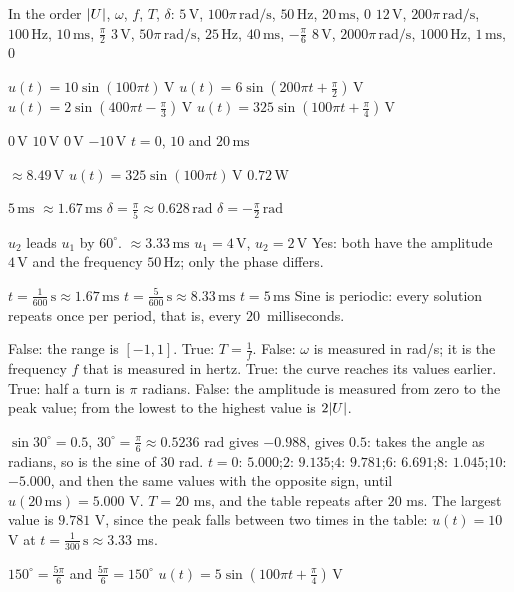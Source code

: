 \begin{facit}
 In the order $\lvert U\rvert$, $\omega$, $f$, $T$, $\delta$:
 $5\,\text{V}$, $100\pi\,\text{rad/s}$, $50\,\text{Hz}$, $20\,\text{ms}$, $0$
 $12\,\text{V}$, $200\pi\,\text{rad/s}$, $100\,\text{Hz}$, $10\,\text{ms}$, $\frac{\pi}{2}$
 $3\,\text{V}$, $50\pi\,\text{rad/s}$, $25\,\text{Hz}$, $40\,\text{ms}$, $-\frac{\pi}{6}$
 $8\,\text{V}$, $2000\pi\,\text{rad/s}$, $1000\,\text{Hz}$, $1\,\text{ms}$, $0$

  $u(t) = 10\sin(100\pi t)\,\text{V}$
 $u(t) = 6\sin(200\pi t + \frac{\pi}{2})\,\text{V}$
 $u(t) = 2\sin(400\pi t - \frac{\pi}{3})\,\text{V}$
 $u(t) = 325\sin(100\pi t + \frac{\pi}{4})\,\text{V}$

  $0\,\text{V}$  $10\,\text{V}$  $0\,\text{V}$  $-10\,\text{V}$
 $t = 0$, $10$ and $20\,\text{ms}$

  $\approx 8.49\,\text{V}$  $u(t) = 325\sin(100\pi t)\,\text{V}$
 $0.72\,\text{W}$

  $5\,\text{ms}$  $\approx 1.67\,\text{ms}$
 $\delta = \frac{\pi}{5} \approx 0.628\,\text{rad}$
 $\delta = -\frac{\pi}{2}\,\text{rad}$

  $u_2$ leads $u_1$ by $60^{\circ}$.  $\approx 3.33\,\text{ms}$
 $u_1 = 4\,\text{V}$, $u_2 = 2\,\text{V}$
 Yes: both have the amplitude $4\,\text{V}$ and the frequency $50\,\text{Hz}$; only the phase
differs.

  $t = \frac{1}{600}\,\text{s} \approx 1.67\,\text{ms}$
 $t = \frac{5}{600}\,\text{s} \approx 8.33\,\text{ms}$  $t = 5\,\text{ms}$
 Sine is periodic: every solution repeats once per period, that is, every
$20$~milliseconds.

  False: the range is $[-1, 1]$.
 True: $T = \frac{1}{f}$.
 False: $\omega$ is measured in rad/s; it is the frequency $f$ that is measured in hertz.
 True: the curve reaches its values earlier.
 True: half a turn is $\pi$ radians.
 False: the amplitude is measured from zero to the peak value; from the lowest to the
highest value is $2\lvert U\rvert$.

  $\sin 30^{\circ} = 0.5$, $30^{\circ} = \frac{\pi}{6} \approx 0.5236$ rad
  gives $-0.988$,  gives $0.5$: 
takes the angle as radians, so  is the sine of $30$ rad.
 $t = 0$: $5.000$;\enspace $2$: $9.135$;\enspace $4$: $9.781$;\enspace $6$:
$6.691$;\enspace $8$: $1.045$;\enspace $10$: $-5.000$, and then the same values with the opposite
sign, until $u(20\,\text{ms}) = 5.000$ V.
 $T = 20$ ms, and the table repeats after $20$ ms. The largest value is $9.781$ V, since the
peak falls between two times in the table: $u(t) = 10$ V at
$t = \frac{1}{300}\,\text{s} \approx 3.33$ ms.

  $150^{\circ} = \frac{5\pi}{6}$ and $\frac{5\pi}{6} = 150^{\circ}$
 $u(t) = 5\sin(100\pi t + \frac{\pi}{4})\,\text{V}$

\end{facit}

